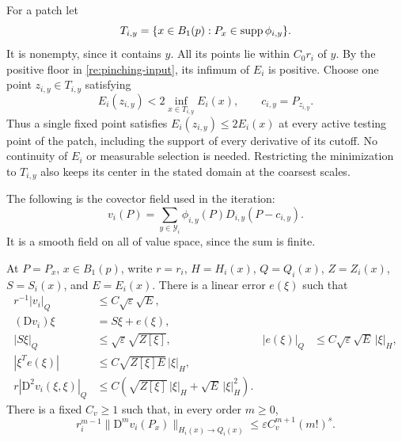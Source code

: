 For a patch let
\[
 T_{i,y}=\{x\in B_1(p):P_x\in\operatorname{supp}\phi_{i,y}\}.
\]
It is nonempty, since it contains $y$.  All its points lie within
$C_0r_i$ of $y$.  By the positive floor in
\eqref{re:pinching-input}, its infimum of $E_i$ is positive.
Choose one point $z_{i,y}\in T_{i,y}$ satisfying
\begin{equation}
 \label{re:fixed-center}
 E_i(z_{i,y})<2\inf_{x\in T_{i,y}}E_i(x),
 \qquad c_{i,y}=P_{z_{i,y}}.
\end{equation}
Thus a single fixed point satisfies
$E_i(z_{i,y})\le2E_i(x)$ at every active testing point of the patch,
including the support of every derivative of its cutoff.  No continuity
of $E_i$ or measurable selection is needed.  Restricting the minimization
to $T_{i,y}$ also keeps its center in the stated domain at the coarsest
scales.

The following is the covector field used in the iteration:
\begin{equation}
 \label{re:field-definition}
 v_i(P)=\sum_{y\in\mathcal Y_i}
           \phi_{i,y}(P)D_{i,y}(P-c_{i,y}).
\end{equation}
It is a smooth field on all of value space, since the sum is finite.

\begin{lemma}
 \label{re:field-estimates}
At $P=P_x$, $x\in B_1(p)$, write $r=r_i$, $H=H_i(x)$,
$Q=Q_i(x)$, $Z=Z_i(x)$, $S=S_i(x)$, and $E=E_i(x)$.
There is a linear error $e(\xi)$ such that
\begin{align}
 r^{-1}|v_i|_Q&\le C\sqrt\varepsilon\sqrt E,
       \label{re:field-value}\\
 (\mathrm Dv_i)\xi&=S\xi+e(\xi),
       \label{re:field-linear}\\
 |S\xi|_Q&\le\sqrt\varepsilon\sqrt{Z[\xi]},
       &|e(\xi)|_Q&\le C\sqrt\varepsilon\sqrt E\,|\xi|_H,
       \label{re:field-small-linear}\\
 |\xi^Te(\xi)|&\le C\sqrt{Z[\xi]E}\,|\xi|_H,
       \label{re:field-diagonal}\\
 r|\mathrm D^2v_i(\xi,\xi)|_Q
       &\le C\left(\sqrt{Z[\xi]}\,|\xi|_H
                          +\sqrt E\,|\xi|_H^2\right).
       \label{re:field-second}
\end{align}
There is a fixed $C_v\ge1$ such that, in every order $m\ge0$,
\begin{equation}
 \label{re:field-jets}
 r_i^{m-1}\|\mathrm D^m v_i(P_x)\|_{H_i(x)\to Q_i(x)}
       \le\varepsilon C_v^{m+1}(m!)^s.
\end{equation}
\end{lemma}

